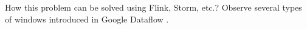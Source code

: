 
\label {fs-typical}

How this problem can be solved using Flink, Storm, etc.? Observe several types of windows introduced in Google Dataflow \cite{Akidau:2015:DMP:2824032.2824076}.